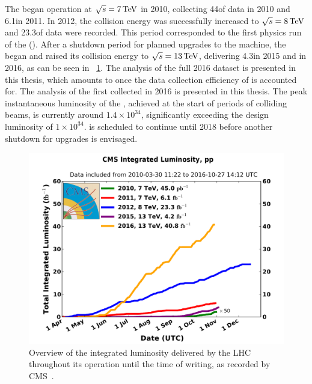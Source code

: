 The \LHC began operation at $\sqrt{s}=7\,\text{Te\hspace{-.08em}V}$ in 2010, collecting 44\ipb of data in 2010 and 6.1\ifb in 2011. In 2012, the collision energy was successfully increased to $\sqrt{s}=8\,\text{Te\hspace{-.08em}V}$ and 23.3\ifb of data were recorded. This period corresponded to the first physics run of the \LHC (\RunI). After a shutdown period for planned upgrades to the machine, the \LHC began \RunII and raised its collision energy to $\sqrt{s}=13\,\text{Te\hspace{-.08em}V}$, delivering 4.3\ifb in 2015 and \totaldatatwentysixteen\ifb in 2016, as can be seen in \Fig~\ref{fig:totalintlumi}. 
\ifNewAnalysis
The analysis of the full 2016 dataset is presented in this thesis, which amounts to \thisanalysislumi\ifb once the data collection efficiency of \CMS is accounted for.
\else
The analysis of the first \thisanalysislumi\ifb collected in 2016 is presented in this thesis.
\fi
The peak instantaneous luminosity of the \LHC, achieved at the start of periods of colliding beams, is currently around $1.4 \times 10^{34}$\lumiunits, significantly exceeding the design luminosity of $1 \times 10^{34}$\lumiunits. \RunII is scheduled to continue until 2018 before another shutdown for upgrades is envisaged. 

\begin{figure}[h]
\centering
\includegraphics[width=1.0\textwidth]{detectorFigures/int_lumi_cumulative_pp_2_210317.pdf}
\caption[Overview of the integrated luminosity delivered by the LHC throughout its operation until the time of writing, as recorded by CMS\quad\cite{CMSLumiPublic}.]{Overview of the integrated luminosity delivered by the LHC throughout its operation until the time of writing, as recorded by CMS~\cite{CMSLumiPublic}.}
\label{fig:totalintlumi}
\end{figure}

